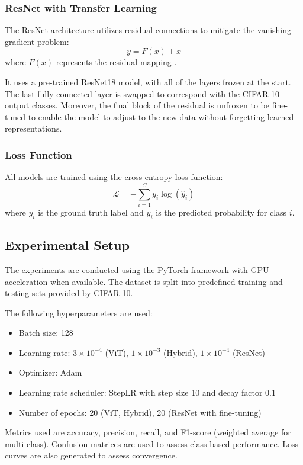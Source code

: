 \documentclass[conference]{IEEEtran}
\begin{document}
\subsubsection{ResNet with Transfer Learning}
The ResNet architecture utilizes residual connections to mitigate the vanishing gradient problem:
\[
y = F(x) + x
\]
where $F(x)$ represents the residual mapping \cite{he2016deep}.

It uses a pre-trained ResNet18 model, with all of the layers frozen at the start. The last fully connected layer is swapped to correspond with the CIFAR-10 output classes. Moreover, the final block of the residual is unfrozen to be fine-tuned to enable the model to adjust to the new data without forgetting learned representations.

\subsubsection{Loss Function}
All models are trained using the cross-entropy loss function:
\[
\mathcal{L} = - \sum_{i=1}^{C} y_i \log(\hat{y}_i)
\]
where $y_i$ is the ground truth label and $\hat{y}_i$ is the predicted probability for class $i$.

\subsection{Experimental Setup}
The experiments are conducted using the PyTorch framework with GPU acceleration when available. The dataset is split into predefined training and testing sets provided by CIFAR-10.

The following hyperparameters are used:
\begin{itemize}
    \item Batch size: 128
    \item Learning rate: $3 \times 10^{-4}$ (ViT), $1 \times 10^{-3}$ (Hybrid), $1 \times 10^{-4}$ (ResNet)
    \item Optimizer: Adam
    \item Learning rate scheduler: StepLR with step size 10 and decay factor 0.1
    \item Number of epochs: 20 (ViT, Hybrid), 20 (ResNet with fine-tuning)
\end{itemize}

Metrics used are accuracy, precision, recall, and F1-score (weighted average for multi-class). Confusion matrices are used to assess class-based performance. Loss curves are also generated to assess convergence.
\end{document}
